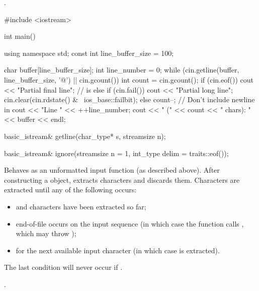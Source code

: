 \begin{itemdescr}
\pnum
\returns
{}.

\pnum
\begin{example}
\begin{codeblock}
#include <iostream>

int main() {
  using namespace std;
  const int line_buffer_size = 100;

  char buffer[line_buffer_size];
  int line_number = 0;
  while (cin.getline(buffer, line_buffer_size, '@\textbackslash@n') || cin.gcount()) {
    int count = cin.gcount();
    if (cin.eof())
      cout << "Partial final line";     //  is 
    else if (cin.fail()) {
      cout << "Partial long line";
      cin.clear(cin.rdstate() & ~ios_base::failbit);
    } else {
      count--;                          // Don't include newline in 
      cout << "Line " << ++line_number;
    }
    cout << " (" << count << " chars): " << buffer << endl;
  }
}
\end{codeblock}
\end{example}
\end{itemdescr}

%
\begin{itemdecl}
basic_istream& getline(char_type* s, streamsize n);
\end{itemdecl}

\begin{itemdescr}
\pnum
\returns
{}
\end{itemdescr}

%
\begin{itemdecl}
basic_istream& ignore(streamsize n = 1, int_type delim = traits::eof());
\end{itemdecl}

\begin{itemdescr}
\pnum
\effects
Behaves as an unformatted input function
(as described above).
After constructing a  object, extracts
characters and discards them.
Characters are extracted until any of the following occurs:
\begin{itemize}
\item
{}
and
 characters have been extracted so far;
\item
end-of-file occurs on the input sequence
(in which case the function calls
,
which may throw
);
\item
{}
for the next available input character 
(in which case  is extracted).
\end{itemize}
\begin{note}
The last condition will never occur if
.
\end{note}

\pnum
\returns
{}.
\end{itemdescr}


